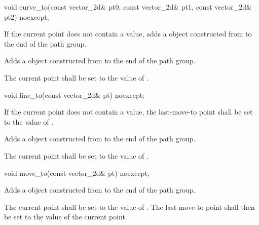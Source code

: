 \begin{itemdecl}
    void curve_to(const vector_2d& pt0, const vector_2d& pt1,
      const vector_2d& pt2) noexcept;
\end{itemdecl}
\begin{itemdescr}
	\pnum
	\effects
	If the current point does not contain a value, adds a  object constructed from  to the end of the path group.
	
	\pnum
	Adds a  object constructed from  to the end of the path group.
	
	\pnum
	The current point shall be set to the value of .
\end{itemdescr}

\begin{itemdecl}
    void line_to(const vector_2d& pt) noexcept;
\end{itemdecl}
\begin{itemdescr}
	\pnum
	\effects
	If the current point does not contain a value, the last-move-to point shall be set to the value of .
	
	\pnum
	Adds a  object constructed from  to the end of the path group.
	
	\pnum
	The current point shall be set to the value of .
\end{itemdescr}

\begin{itemdecl}
    void move_to(const vector_2d& pt) noexcept;
\end{itemdecl}
\begin{itemdescr}
	\pnum
	\effects
	Adds a  object constructed from  to the end of the path group.
	
	\pnum
	The current point shall be set to the value of . The last-move-to point shall then be set to the value of the current point.
\end{itemdescr}

